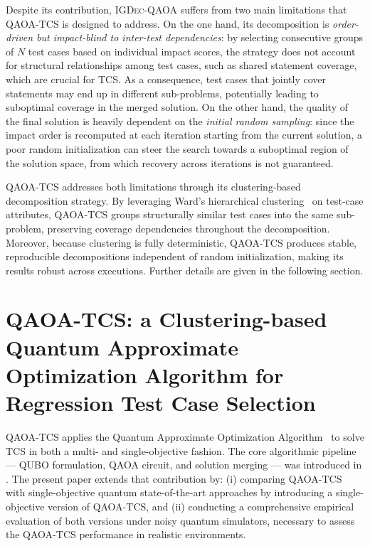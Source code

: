 Despite its contribution, \textsc{IGDec-QAOA} suffers from two main limitations that \textsc{QAOA-TCS} is designed to address. On the one hand, its decomposition is \textit{order-driven but impact-blind to inter-test dependencies}: by selecting consecutive groups of $N$ test cases based on individual impact scores, the strategy does not account for structural relationships among test cases, such as shared statement coverage, which are crucial for TCS. As a consequence, test cases that jointly cover statements may end up in different sub-problems, potentially leading to suboptimal coverage in the merged solution. On the other hand, the quality of the final solution is heavily dependent on the \textit{initial random sampling}: since the impact order is recomputed at each iteration starting from the current solution, a poor random initialization can steer the search towards a suboptimal region of the solution space, from which recovery across iterations is not guaranteed.

\textsc{QAOA-TCS} addresses both limitations through its clustering-based decomposition strategy. By leveraging Ward's hierarchical clustering~\citep{ward1963clustering} on test-case attributes, \textsc{QAOA-TCS} groups structurally similar test cases into the same sub-problem, preserving coverage dependencies throughout the decomposition. Moreover, because clustering is fully deterministic, \textsc{QAOA-TCS} produces stable, reproducible decompositions independent of random initialization, making its results robust across executions. Further details are given in the following section.

\section{QAOA-TCS: a Clustering-based Quantum Approximate Optimization Algorithm for Regression Test Case Selection}
\label{sec:3}

\textsc{QAOA-TCS} applies the Quantum Approximate Optimization Algorithm~\citep{farhi2014qaoa} to solve TCS in both a multi- and single-objective fashion. The core algorithmic pipeline — QUBO formulation, QAOA circuit, and solution merging — was introduced in \citet{qaoa_tcs}. The present paper extends that contribution by: (i) comparing \textsc{QAOA-TCS} with single-objective quantum state-of-the-art approaches by introducing a single-objective version of \textsc{QAOA-TCS}, and (ii) conducting a comprehensive empirical evaluation of both versions under noisy quantum simulators, necessary to assess the \textsc{QAOA-TCS} performance in realistic environments.

